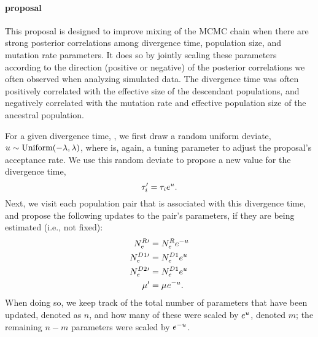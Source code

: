 \paragraph{\timesizeratemixer proposal}
This proposal is designed to improve mixing of the MCMC chain when there are
strong posterior correlations among divergence time, population size, and
mutation rate parameters.
It does so by jointly scaling these parameters according to the direction
(positive or negative) of the posterior correlations we often observed when
analyzing simulated data.
The divergence time was often positively correlated with the effective size of
the descendant populations, and negatively correlated with the mutation rate
and effective population size of the ancestral population.

For a given divergence time, \divtime[i],
we first draw a random uniform deviate,
$\uniformdeviate \sim \textrm{Uniform}(-\tuningparameter, \tuningparameter)$,
where \tuningparameter is, again, a tuning parameter to adjust the proposal's
acceptance rate.
We use this random deviate to propose a new value for the divergence time,
\[
    \divtime[i]\proposed = \divtime[i] e^{\uniformdeviate}.
\]
Next, we visit each population pair that is associated with this
divergence time, and propose the following updates to the
pair's parameters, if they are being estimated (i.e., not fixed):
\begin{equation}
    \begin{split}
        \epopsize[\rootpopindex]{}\proposed & = \epopsize[\rootpopindex]{} e^{-\uniformdeviate} \\
        \epopsize[\descendantpopindex{1}]{}\proposed & = \epopsize[\descendantpopindex{1}]{} e^{\uniformdeviate} \\
        \epopsize[\descendantpopindex{2}]{}\proposed & = \epopsize[\descendantpopindex{1}]{} e^{\uniformdeviate} \\
        \murate\proposed & = \murate e^{-\uniformdeviate}.
    \end{split}
\end{equation}
When doing so, we keep track of the total number of parameters
that have been updated, denoted as $n$,
and how many of these were scaled by
$e^{\uniformdeviate}$, denoted $m$;
the remaining $n-m$ parameters were scaled by $e^{-\uniformdeviate}$.

